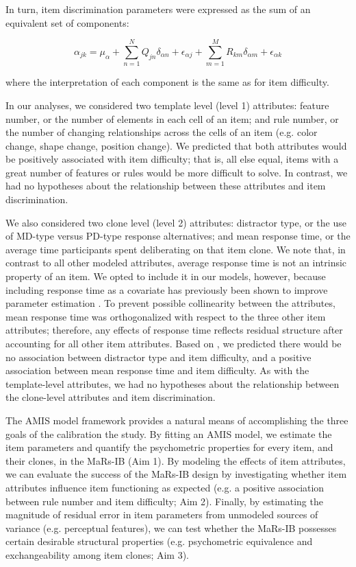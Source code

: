 \documentclass[a4paper,man,natbib]{apa6}
\begin{document}
\noindent In turn, item discrimination parameters were expressed as the sum of an equivalent set of components:

\begin{equation}
\alpha_{jk} = \mu_\alpha + \sum_{n=1}^N Q_{jn} \delta_{\alpha n} + \epsilon_{\alpha j} + \sum_{m=1}^M R_{km} \delta_{\alpha m} + \epsilon_{\alpha k}
\end{equation}

\noindent where the interpretation of each component is the same as for item difficulty.

In our analyses, we considered two template level (level 1) attributes: feature number, or the number of elements in each cell of an item; and rule number, or the number of changing relationships across the cells of an item (e.g. color change, shape change, position change). We predicted that both attributes would be positively associated with item difficulty; that is, all else equal, items with a great number of features or rules would be more difficult to solve. In contrast, we had no hypotheses about the relationship between these attributes and item discrimination. 

We also considered two clone level (level 2) attributes: distractor type, or the use of MD-type versus PD-type response alternatives; and mean response time, or the average time participants spent deliberating on that item clone. We note that, in contrast to all other modeled attributes, average response time is not an intrinsic property of an item. We opted to include it in our models, however, because including response time as a covariate has previously been shown to improve parameter estimation \citep{bertling2018using}. To prevent possible collinearity between the attributes, mean response time was orthogonalized with respect to the three other item attributes; therefore, any effects of response time reflects residual structure after accounting for all other item attributes. Based on \cite{chierchia2019matrix}, we predicted there would be no association between distractor type and item difficulty, and a positive association between mean response time and item difficulty. As with the template-level attributes, we had no hypotheses about the relationship between the clone-level attributes and item discrimination. 

The AMIS model framework provides a natural means of accomplishing the three goals of the calibration the study. By fitting an AMIS model, we estimate the item parameters and quantify the psychometric properties for every item, and their clones, in the MaRs-IB (Aim 1). By modeling the effects of item attributes, we can evaluate the success of the MaRs-IB design by investigating whether item attributes influence item functioning as expected (e.g. a positive association between rule number and item difficulty; Aim 2). Finally, by estimating the magnitude of residual error in item parameters from unmodeled sources of variance (e.g. perceptual features), we can test whether the MaRs-IB possesses certain desirable structural properties (e.g. psychometric equivalence and exchangeability among item clones; Aim 3). 
\end{document}
